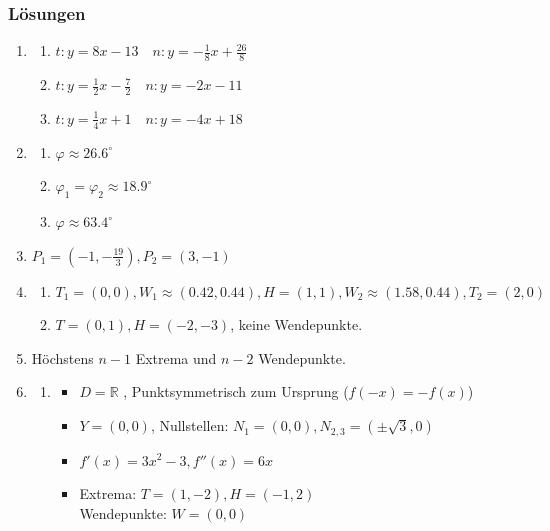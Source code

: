 \subsubsection*{Lösungen}
\begin{enumerate}
    \item \begin{enumerate}
              \item $t: y=8x-13 \quad n: y= -\frac{1}{8}x +\frac{26}{8}$
              \item $t: y=\frac{1}{2}x-\frac{7}{2} \quad n: y= -2x -11$
              \item $t: y=\frac{1}{4}x+1 \quad n: y= -4x +18$
          \end{enumerate}
    \item \begin{enumerate}
              \item $\varphi\approx 26.6^\circ$
              \item $\varphi_1=\varphi_2\approx 18.9^\circ$
              \item $\varphi\approx 63.4^\circ$
          \end{enumerate}
    \item $P_1 =\left(-1, -\frac{19}{3}\right), P_2 = (3,-1 )$
    \item \begin{enumerate}
              \item $T_1 = (0,0), W_1 \approx(0.42, 0.44) , H =(1,1), W_2\approx(1.58, 0.44), T_2=(2,0)$
              \item $T=(0, 1), H = (-2, -3)$, keine Wendepunkte.
          \end{enumerate}
    \item Höchstens $n-1$ Extrema und $n-2$ Wendepunkte.
    \item \begin{enumerate}
              \item \begin{itemize}
                        \item $D = \mathbb{R}$ , Punktsymmetrisch zum Ursprung ($f(-x) = -f(x)$)
                        \item $Y = (0, 0)$, Nullstellen: $N_1 = (0,0), N_{2,3} = (\pm \sqrt{3}, 0)$
                        \item $f'(x) =3x^2-3, f''(x) = 6x$
                        \item Extrema: $T=(1,-2), H=(-1, 2)$ \\
                              Wendepunkte: $W = (0, 0)$

\end{itemize}
\end{enumerate}
\end{enumerate}
